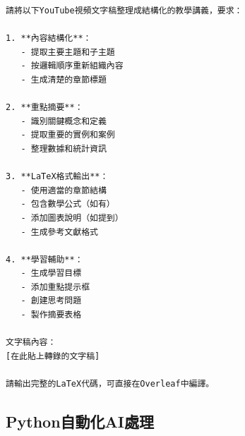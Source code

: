 \documentclass[12pt,a4paper]{article}
\begin{document}
\begin{lstlisting}[caption=AI整理提示詞範例]
請將以下YouTube視頻文字稿整理成結構化的教學講義，要求：

1. **內容結構化**：
   - 提取主要主題和子主題
   - 按邏輯順序重新組織內容
   - 生成清楚的章節標題

2. **重點摘要**：
   - 識別關鍵概念和定義
   - 提取重要的實例和案例
   - 整理數據和統計資訊

3. **LaTeX格式輸出**：
   - 使用適當的章節結構
   - 包含數學公式（如有）
   - 添加圖表說明（如提到）
   - 生成參考文獻格式

4. **學習輔助**：
   - 生成學習目標
   - 添加重點提示框
   - 創建思考問題
   - 製作摘要表格

文字稿內容：
[在此貼上轉錄的文字稿]

請輸出完整的LaTeX代碼，可直接在Overleaf中編譯。
\end{lstlisting}

\subsection{Python自動化AI處理}
\end{document}
